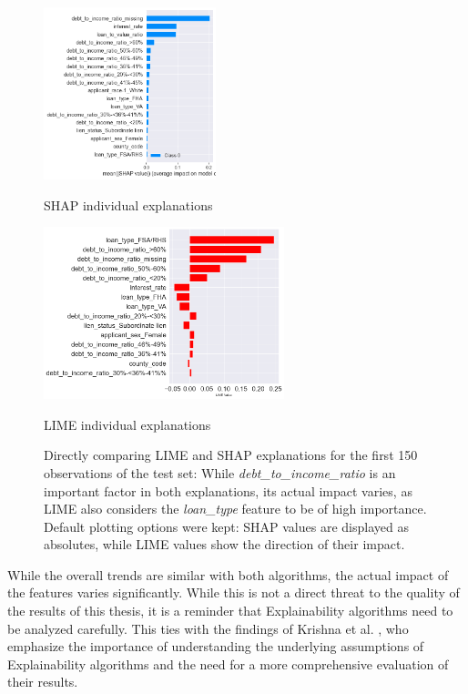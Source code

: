 \begin{figure}[h]
    \centering
    \begin{minipage}{0.5\textwidth}
        \centering
        \includegraphics[width=\textwidth,height=5cm,keepaspectratio]{images/CHXX_UPDATE_SHAP_individual.png}
        \caption{SHAP individual explanations}
        \label{fig:SHAP_explanations}
    \end{minipage}\hfill
    \begin{minipage}{0.5\textwidth}
        \centering
        \includegraphics[width=\textwidth,height=5cm,keepaspectratio]{images/CHXX_UPDATE_LIME_individual.png}
        \caption{LIME individual explanations}
        \label{fig:LIME_explanations}
    \end{minipage}
    \caption*{Directly comparing LIME and SHAP explanations for the first 150 observations of the test set: While \textit{debt\_to\_income\_ratio} is an important factor in both explanations, its actual impact varies, as LIME also considers the \textit{loan\_type} feature to be of high importance. Default plotting options were kept: SHAP values are displayed as absolutes, while LIME values show the direction of their impact.}
\end{figure}

While the overall trends are similar with both algorithms, the actual impact of the features varies significantly. While this is not a direct threat to the quality of the results of this thesis, it is a reminder that Explainability algorithms need to be analyzed carefully. 
This ties with the findings of Krishna et al. \parencite{Krishna2022}, who emphasize the importance of understanding the underlying assumptions of Explainability algorithms and the need for a more comprehensive evaluation of their results.

